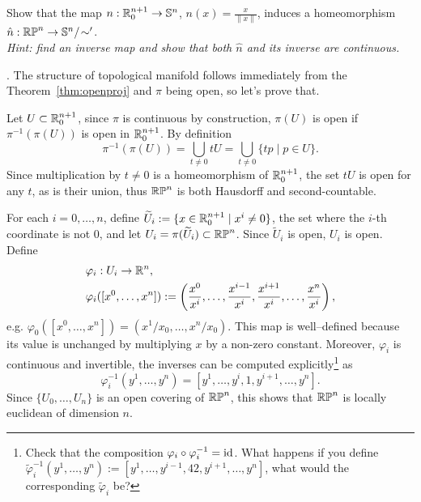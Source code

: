 \begin{example}
  \begin{exercise}\label{exe:RPSN}
    Show that the map $n: \mathbb{R}^{n+1}_0\to \mathbb{S}^n$, $n(x) = \frac{x}{\|x\|}$, induces a homeomorphism $\hat n:\mathbb{RP}^n \to \mathbb{S}^n/\!\sim'$.\\
    \textit{\small Hint: find an inverse map and show that both $\hat n$ and its inverse are continuous.}
  \end{exercise}

  .
  The structure of topological manifold follows immediately from the Theorem~\ref{thm:openproj} and $\pi$ being open, so let's prove that.

  Let $U\subset\mathbb{R}_0^{n+1}$, since $\pi$ is continuous by construction, $\pi(U)$ is open if $\pi^{-1}(\pi(U))$ is open in $\mathbb{R}^{n+1}_0$.
  By definition
  \begin{equation}
    \pi^{-1}(\pi(U)) = \bigcup_{t\neq 0} tU = \bigcup_{t\neq 0}\{tp \mid p\in U\}.
  \end{equation}
  Since multiplication by $t\neq 0$ is a homeomorphism of $\mathbb{R}_0^{n+1}$, the set $t U$ is open for any $t$, as is their union, thus $\mathbb{RP}^n$ is both Hausdorff and second-countable.

  For each $i=0,\ldots,n$, define $\widetilde U_i := \{x\in\mathbb{R}^{n+1}_0 \mid x^i\neq0\}$, the set where the $i$-th coordinate is not $0$, and let $U_i = \pi(\widetilde U_i)\subset \mathbb{RP}^n$.
  Since $\widetilde U_i$ is open, $U_i$ is open.
  Define
  \begin{align}
     & \varphi_i:U_i\to\mathbb{R}^n,                                                                                                               \\
     & \varphi_i([x^0, \ldots, x^n]):= \left(\frac{x^0}{x^i},\ldots,\frac{x^{i-1}}{x^i},\frac{x^{i+1}}{x^i},\ldots,\frac{x^n}{x^i}\right),
  \end{align}
  e.g. $\varphi_0([x^0, \ldots, x^n]) = (x^1/x_0, \ldots, x^n/x_0)$.
  This map is well--defined because its value is unchanged by multiplying $x$ by a non-zero constant.
  Moreover, $\varphi_i$ is continuous and invertible, the inverses can be computed explicitly\footnote{Check that the composition $\varphi_i \circ \varphi_i^{-1} = \operatorname{id}$. What happens if you define $\widetilde\varphi^{-1}_i(y^1, \ldots, y^n) := \left[y^1, \ldots, y^{i-1}, 42, y^{i+1}, \ldots, y^n\right]$, what would the corresponding $\widetilde\varphi_i$ be?} as
  \begin{equation}
    \varphi_i^{-1}(y^1,\ldots,y^n) = \left[y^1, \ldots, y^{i}, 1, y^{i+1}, \ldots, y^n\right].
  \end{equation}
  Since $\{U_0, \ldots, U_n\}$ is an open covering of $\mathbb{RP}^n$, this shows that $\mathbb{RP}^n$ is locally euclidean of dimension $n$.


\end{example}
